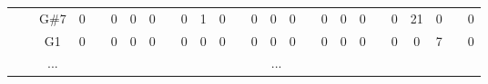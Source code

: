 \documentclass[12pt]{article}
\begin{document}
\begin{table}[!ht]
{\begin{tabular}{clcccccccccccccccccccccccc}
									& \multicolumn{1}{l|}{} & \multicolumn{1}{c|}{G\#7} & \multicolumn{1}{c|}{0}    & \multicolumn{1}{c|}{}                     & \multicolumn{1}{c|}{0}    & \multicolumn{1}{c|}{0}    & \multicolumn{1}{c|}{0}  & \multicolumn{1}{c|}{}                     & \multicolumn{1}{c|}{0}  & \multicolumn{1}{c|}{1}  & \multicolumn{1}{c|}{0}  & \multicolumn{1}{c|}{}                     & \multicolumn{1}{c|}{0}    & \multicolumn{1}{c|}{0}    & \multicolumn{1}{c|}{0}    & \multicolumn{1}{c|}{}                     & \multicolumn{1}{c|}{0}  & \multicolumn{1}{c|}{0}  & \multicolumn{1}{c|}{0}    & \multicolumn{1}{c|}{}                     & \multicolumn{1}{c|}{0}    & \multicolumn{1}{c|}{21}   & \multicolumn{1}{c|}{0}  & \multicolumn{1}{c|}{}                     & \multicolumn{1}{c|}{0}  \\ \cline{3-4} \cline{6-8} \cline{10-12} \cline{14-16} \cline{18-20} \cline{22-24} \cline{26-26} 
									& \multicolumn{1}{l|}{} & \multicolumn{1}{c|}{G1}   & \multicolumn{1}{c|}{0}    & \multicolumn{1}{c|}{}                     & \multicolumn{1}{c|}{0}    & \multicolumn{1}{c|}{0}    & \multicolumn{1}{c|}{0}  & \multicolumn{1}{c|}{}                     & \multicolumn{1}{c|}{0}  & \multicolumn{1}{c|}{0}  & \multicolumn{1}{c|}{0}  & \multicolumn{1}{c|}{}                     & \multicolumn{1}{c|}{0}    & \multicolumn{1}{c|}{0}    & \multicolumn{1}{c|}{0}    & \multicolumn{1}{c|}{}                     & \multicolumn{1}{c|}{0}  & \multicolumn{1}{c|}{0}  & \multicolumn{1}{c|}{0}    & \multicolumn{1}{c|}{}                     & \multicolumn{1}{c|}{0}    & \multicolumn{1}{c|}{0}    & \multicolumn{1}{c|}{7}  & \multicolumn{1}{c|}{}                     & \multicolumn{1}{c|}{0}  \\ \cline{3-4} \cline{6-8} \cline{10-12} \cline{14-16} \cline{18-20} \cline{22-24} \cline{26-26} 
									& \multicolumn{1}{l|}{} & \multicolumn{1}{c|}{...}  & \multicolumn{23}{c|}{...}                                                                                                                                                                                                                                                                                                                                                                                                                                                                                                                                                                                                                                                                                                                         \\ \cline{3-4} \cline{6-8} \cline{10-12} \cline{14-16} \cline{18-20} \cline{22-24} \cline{26-26} 

\end{tabular}}
\end{table}
\end{document}
